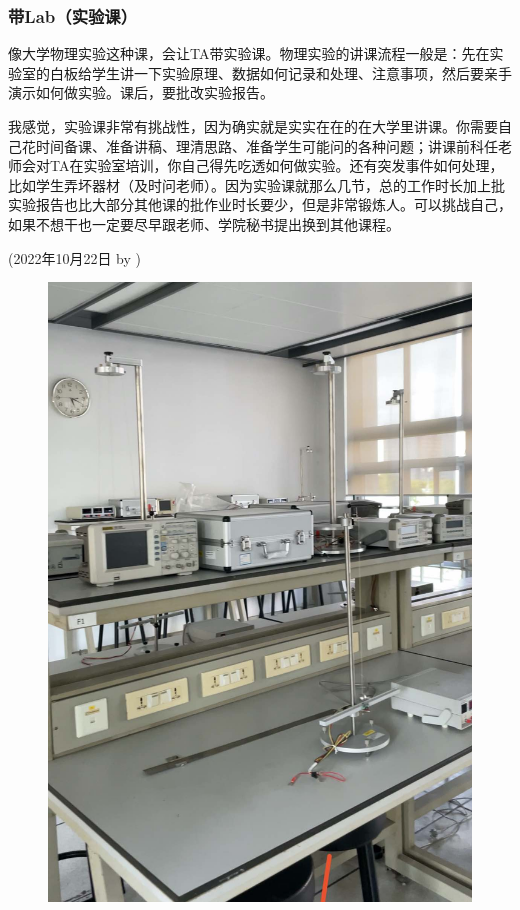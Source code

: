 \subsubsection{带Lab（实验课）}
\begin{newminipage}[0.55]
    像大学物理实验这种课，会让TA带实验课。物理实验的讲课流程一般是：先在实验室的白板给学生讲一下实验原理、数据如何记录和处理、注意事项，然后要亲手演示如何做实验。课后，要批改实验报告。

    我感觉，实验课非常有挑战性，因为确实就是实实在在的在大学里讲课。你需要自己花时间备课、准备讲稿、理清思路、准备学生可能问的各种问题；讲课前科任老师会对TA在实验室培训，你自己得先吃透如何做实验。还有突发事件如何处理，比如学生弄坏器材（及时问老师）。因为实验课就那么几节，总的工作时长加上批实验报告也比大部分其他课的批作业时长要少，但是非常锻炼人。可以挑战自己，如果不想干也一定要尽早跟老师、学院秘书提出换到其他课程。
    \begin{flushright}
        (2022年10月22日 by \Wu)
    \end{flushright}
\end{newminipage}
%
\begin{newminipage}[0.45]
    \begin{figure}[H]
        \includegraphics[width=0.95\columnwidth, right]{author-folder/Kai.Wu/lab.jpg}
    \end{figure}
\end{newminipage}



